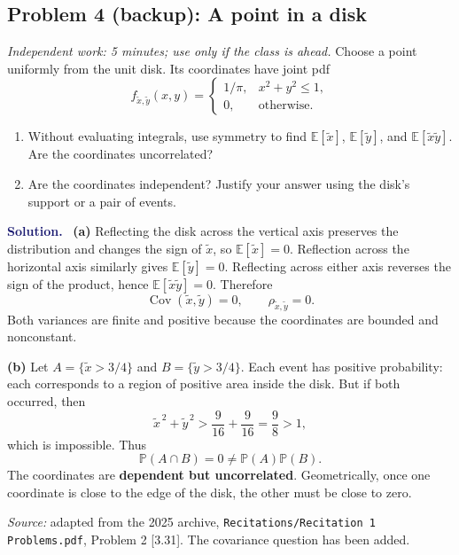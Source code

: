 \documentclass[11pt]{article}
\newif\ifsolutions
\newcommand{\Pbb}{\mathbb{P}}
\newcommand{\E}{\mathbb{E}}
\newcommand{\Cov}{\operatorname{Cov}}
\newcommand{\rv}[1]{\widetilde{#1}}
\newenvironment{answer}{%
    \par\medskip\noindent\textcolor{MidnightBlue}{\textbf{Solution.}}\ }
    {\par\medskip}
\newcommand{\workingspace}[1]{}
\newcommand{\workingspace}[1]{\vspace{#1}}
\begin{document}
\newpage
\subsection*{Problem 4 (backup): A point in a disk}
\noindent\textit{Independent work: 5 minutes; use only if the class is ahead.}
Choose a point uniformly from the unit disk. Its coordinates have joint pdf
\[
  f_{\rv{x},\rv{y}}(x,y)=
  \begin{cases}
    1/\pi,& x^2+y^2\leq1,\\
    0,& \text{otherwise}.
  \end{cases}
\]
\begin{enumerate}
  \item Without evaluating integrals, use symmetry to find
    $\E[\rv{x}]$, $\E[\rv{y}]$, and $\E[\rv{x}\rv{y}]$.
    Are the coordinates uncorrelated?
  \item Are the coordinates independent? Justify your answer using the
    disk's support or a pair of events.
\end{enumerate}
\workingspace{11cm}

\begin{answer}
\textbf{(a)} Reflecting the disk across the vertical axis preserves the
distribution and changes the sign of $\rv{x}$, so $\E[\rv{x}]=0$.
Reflection across the horizontal axis similarly gives $\E[\rv{y}]=0$.
Reflecting across either axis reverses the sign of the product, hence
$\E[\rv{x}\rv{y}]=0$. Therefore
\[
  \boxed{\Cov(\rv{x},\rv{y})=0,\qquad\rho_{\rv{x},\rv{y}}=0.}
\]
Both variances are finite and positive because the coordinates are bounded
and nonconstant.

\textbf{(b)} Let $A=\{\rv{x}>3/4\}$ and $B=\{\rv{y}>3/4\}$.
Each event has positive probability: each corresponds to a region of
positive area inside the disk. But if both occurred, then
\[
  \rv{x}^{\,2}+\rv{y}^{\,2}
     >\frac9{16}+\frac9{16}=\frac98>1,
\]
which is impossible. Thus
\[
  \Pbb(A\cap B)=0\ne\Pbb(A)\Pbb(B).
\]
The coordinates are \textbf{dependent but uncorrelated}. Geometrically,
once one coordinate is close to the edge of the disk, the other must be
close to zero.
\end{answer}

\vfill
\noindent\textit{Source:} adapted from the 2025 archive,
\texttt{Recitations/Recitation 1 Problems.pdf}, Problem 2 [3.31].
The covariance question has been added.

\ifsolutions
\newpage
\end{document}
